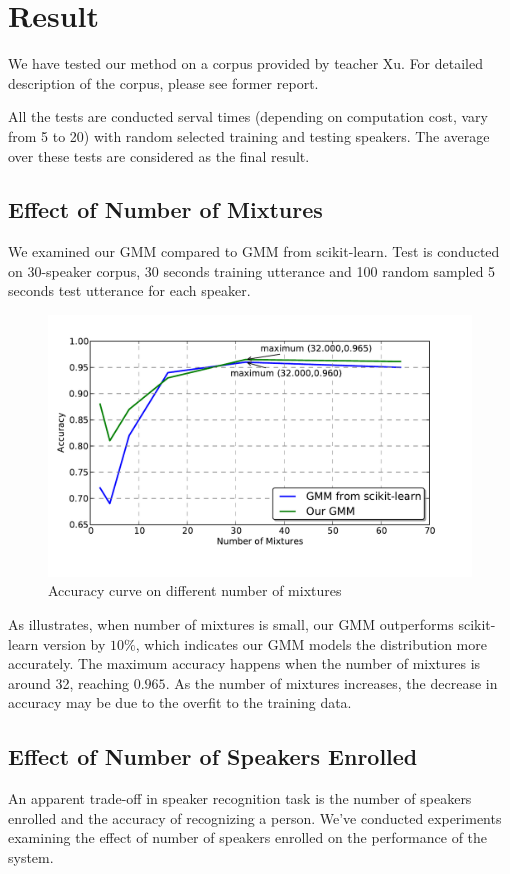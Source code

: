 \section{Result}
We have tested our method on a corpus provided by teacher Xu. For detailed
description of the corpus, please see former report.

All the tests are conducted serval times (depending on computation cost,
vary from 5 to 20) with random selected training and testing speakers.
The average over these tests are considered as the final
result.

\subsection{Effect of Number of Mixtures}
We examined our GMM compared to GMM from scikit-learn.
Test is conducted on 30-speaker corpus, 30 seconds training utterance
and 100 random sampled 5 seconds test utterance for each speaker.

\begin{figure}[!ht]
	\label{fig:mixture}
	\centering
	\includegraphics[width=\linewidth]{res/mixture-both.pdf}
	\caption{Accuracy curve on different number of mixtures}
\end{figure}

As  illustrates, when number of mixtures is small,
our GMM outperforms scikit-learn version by $10\%$, which indicates our
GMM models the distribution more accurately. The maximum accuracy
happens when the number of mixtures is around 32, reaching $0.965$. As
the number of mixtures increases, the decrease in accuracy
may be due to the overfit to the training data.

\subsection{Effect of Number of Speakers Enrolled}
An apparent trade-off in speaker recognition task is the number of speakers
enrolled and the accuracy of recognizing a person. We've conducted experiments
examining the effect of number of speakers enrolled on the performance of the
system.


